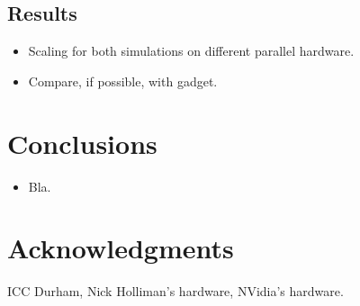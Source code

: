 \documentclass[final]{siamltex}
\begin{document}
\subsection{Results}

\begin{itemize}

    \item Scaling for both simulations on different parallel hardware.
    
    \item Compare, if possible, with {\sc gadget}.
        
\end{itemize}


\section{Conclusions}

\begin{itemize}

    \item Bla.
        
\end{itemize}


\section*{Acknowledgments}

ICC Durham, Nick Holliman's hardware, NVidia's hardware.


\nopagebreak

\end{document}
